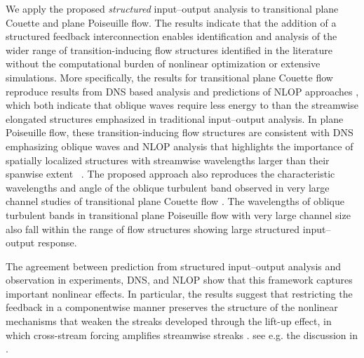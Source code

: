 We apply the proposed \emph{structured} input--output analysis to transitional plane Couette and plane Poiseuille flow. The results indicate that the addition of a structured feedback interconnection enables identification and analysis of the wider range of transition-inducing flow structures identified in the literature without the computational burden of nonlinear optimization or extensive simulations. More specifically, the results for transitional plane Couette flow reproduce results from DNS based analysis \citep{reddy1998stability} and predictions of NLOP approaches \citep{rabin2012triggering}, which both indicate that oblique waves require less energy to  than the streamwise elongated structures emphasized in traditional input--output analysis. In plane Poiseuille flow, these transition-inducing flow structures are consistent with DNS \citep{reddy1998stability} emphasizing oblique waves and NLOP analysis that highlights the importance of spatially localized structures with streamwise wavelengths larger than their spanwise extent ~\citep{farano2015hairpin}. The proposed approach also reproduces the characteristic wavelengths and angle of the oblique turbulent band observed in very large channel studies of transitional plane Couette flow \citep{prigent2003long}. The wavelengths of oblique turbulent bands in transitional plane Poiseuille flow with very large channel size \citep{kanazawa2018lifetime} also fall within the range of flow structures showing large structured input--output response. 

The agreement between prediction from structured input--output analysis and observation in experiments, DNS, and NLOP show that this framework captures important nonlinear effects.
In particular, the results suggest that restricting the feedback in a componentwise manner preserves the structure of the nonlinear mechanisms that weaken the streaks developed through the lift-up effect, in which cross-stream forcing amplifies streamwise streaks \citep{ellingsen1975stability,landahl1975wave,Brandt2014}.  see e.g. the discussion in \citet{jovanovic2020bypass}.  

